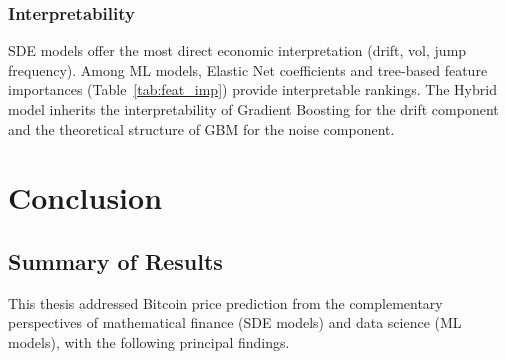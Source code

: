 \documentclass[12pt, a4paper, oneside]{report}
\theoremstyle{plain}
\theoremstyle{definition}
\theoremstyle{remark}
\begin{document}
\subsection{Interpretability}

SDE models offer the most direct economic interpretation (drift, vol, jump
frequency).  Among ML models, Elastic Net coefficients and tree-based feature
importances (Table~\ref{tab:feat_imp}) provide interpretable rankings.  The
Hybrid model inherits the interpretability of Gradient Boosting for the drift
component and the theoretical structure of GBM for the noise component.

\clearpage
\chapter*{Conclusion}

\section*{Summary of Results}

This thesis addressed Bitcoin price prediction from the complementary
perspectives of mathematical finance (SDE models) and data science (ML
models), with the following principal findings.
\end{document}
